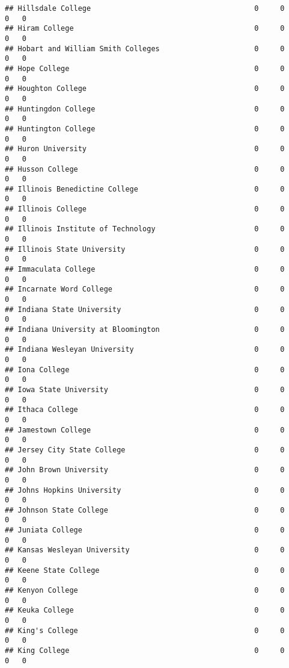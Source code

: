\documentclass[
]{article}
\begin{document}
\begin{verbatim}
## Hillsdale College                                      0     0        0   0
## Hiram College                                          0     0        0   0
## Hobart and William Smith Colleges                      0     0        0   0
## Hope College                                           0     0        0   0
## Houghton College                                       0     0        0   0
## Huntingdon College                                     0     0        0   0
## Huntington College                                     0     0        0   0
## Huron University                                       0     0        0   0
## Husson College                                         0     0        0   0
## Illinois Benedictine College                           0     0        0   0
## Illinois College                                       0     0        0   0
## Illinois Institute of Technology                       0     0        0   0
## Illinois State University                              0     0        0   0
## Immaculata College                                     0     0        0   0
## Incarnate Word College                                 0     0        0   0
## Indiana State University                               0     0        0   0
## Indiana University at Bloomington                      0     0        0   0
## Indiana Wesleyan University                            0     0        0   0
## Iona College                                           0     0        0   0
## Iowa State University                                  0     0        0   0
## Ithaca College                                         0     0        0   0
## Jamestown College                                      0     0        0   0
## Jersey City State College                              0     0        0   0
## John Brown University                                  0     0        0   0
## Johns Hopkins University                               0     0        0   0
## Johnson State College                                  0     0        0   0
## Juniata College                                        0     0        0   0
## Kansas Wesleyan University                             0     0        0   0
## Keene State College                                    0     0        0   0
## Kenyon College                                         0     0        0   0
## Keuka College                                          0     0        0   0
## King's College                                         0     0        0   0
## King College                                           0     0        0   0

\end{verbatim}
\end{document}
